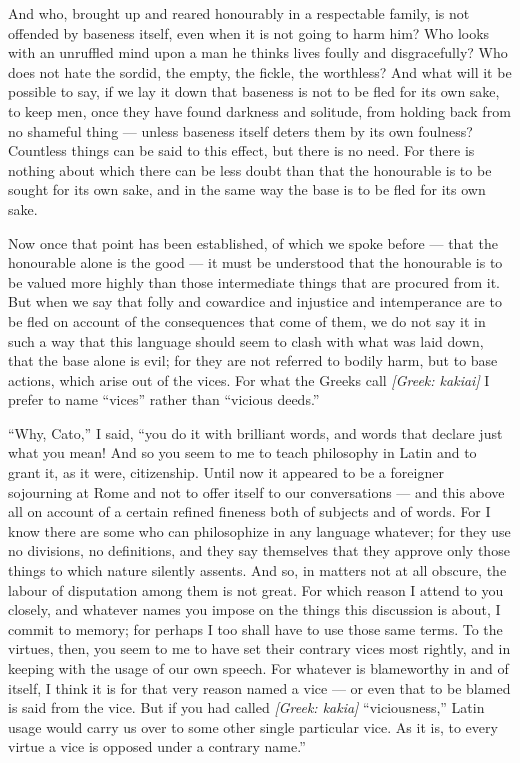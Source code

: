  And who, brought up and reared honourably in a respectable family, is not offended by baseness itself, even when it is not going to harm him? Who looks with an unruffled mind upon a man he thinks lives foully and disgracefully? Who does not hate the sordid, the empty, the fickle, the worthless? And what will it be possible to say, if we lay it down that baseness is not to be fled for its own sake, to keep men, once they have found darkness and solitude, from holding back from no shameful thing — unless baseness itself deters them by its own foulness? Countless things can be said to this effect, but there is no need. For there is nothing about which there can be less doubt than that the honourable is to be sought for its own sake, and in the same way the base is to be fled for its own sake.

 Now once that point has been established, of which we spoke before — that the honourable alone is the good — it must be understood that the honourable is to be valued more highly than those intermediate things that are procured from it. But when we say that folly and cowardice and injustice and intemperance are to be fled on account of the consequences that come of them, we do not say it in such a way that this language should seem to clash with what was laid down, that the base alone is evil; for they are not referred to bodily harm, but to base actions, which arise out of the vices. For what the Greeks call \textit{[Greek: kakiai]} I prefer to name ``vices'' rather than ``vicious deeds.''

 ``Why, Cato,'' I said, ``you do it with brilliant words, and words that declare just what you mean! And so you seem to me to teach philosophy in Latin and to grant it, as it were, citizenship. Until now it appeared to be a foreigner sojourning at Rome and not to offer itself to our conversations — and this above all on account of a certain refined fineness both of subjects and of words. For I know there are some who can philosophize in any language whatever; for they use no divisions, no definitions, and they say themselves that they approve only those things to which nature silently assents. And so, in matters not at all obscure, the labour of disputation among them is not great. For which reason I attend to you closely, and whatever names you impose on the things this discussion is about, I commit to memory; for perhaps I too shall have to use those same terms. To the virtues, then, you seem to me to have set their contrary vices most rightly, and in keeping with the usage of our own speech. For whatever is blameworthy in and of itself, I think it is for that very reason named a vice — or even that to be blamed is said from the vice. But if you had called \textit{[Greek: kakia]} ``viciousness,'' Latin usage would carry us over to some other single particular vice. As it is, to every virtue a vice is opposed under a contrary name.''

